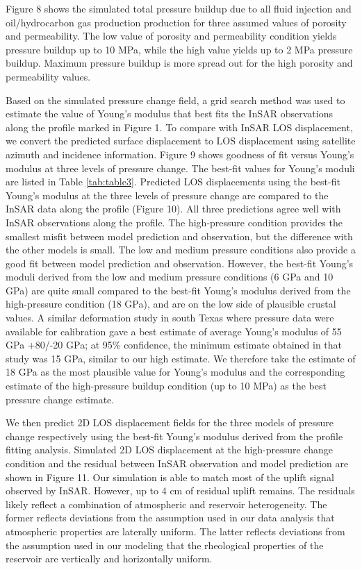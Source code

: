 Figure 8 shows the simulated total pressure buildup due to all fluid injection and oil/hydrocarbon gas production production for three assumed values of porosity and permeability. The low value of porosity and permeability condition yields pressure buildup up to 10 MPa, while the high value yields up to 2 MPa pressure buildup. Maximum pressure buildup is more spread out for the high porosity and permeability values.

Based on the simulated pressure change field, a grid search method was used to estimate the value of Young’s modulus that best fits the InSAR observations along the profile marked in Figure 1.   To compare with InSAR LOS displacement, we convert the predicted surface displacement to LOS displacement using satellite azimuth and incidence information.  Figure 9 shows goodness of fit versus Young’s modulus at three levels of pressure change.  The best-fit values for Young’s moduli are listed in Table \ref{tab:table3}.  Predicted LOS displacements using the best-fit Young’s modulus at the three levels of pressure change are compared to the InSAR data along the profile (Figure 10).  All three predictions agree well with InSAR observations along the profile.  The high-pressure condition provides the smallest misfit between model prediction and observation, but the difference with the other models is small.  The low and medium pressure conditions also provide a good fit between model prediction and observation.  However, the best-fit Young’s moduli derived from the low and medium pressure conditions (6 GPa  and 10 GPa) are quite small compared to the best-fit Young’s modulus derived from the high-pressure condition (18 GPa), and are on the low side of plausible crustal values.   A similar deformation study in south Texas \cite{karegar2015gps} where pressure data were available for calibration gave a best estimate of average Young’s modulus of 55 GPa +80/-20 GPa; at 95\% confidence, the minimum estimate obtained in that study was 15 GPa, similar to our high estimate.  We therefore take the estimate of 18 GPa as the most plausible value for Young’s modulus and the corresponding estimate of the high-pressure buildup condition (up to 10 MPa) as the best pressure change estimate.

We then predict 2D LOS displacement fields for the three models of pressure change respectively using the best-fit Young’s modulus derived from the profile fitting analysis.  Simulated 2D LOS displacement at the high-pressure change condition and the residual between InSAR observation and model prediction are shown in Figure 11.  Our simulation is able to match most of the uplift signal observed by InSAR.  However, up to 4 cm of residual uplift remains.  The residuals likely reflect a combination of atmospheric and reservoir heterogeneity.  The former reflects deviations from the assumption used in our data analysis that atmospheric properties are laterally uniform.  The latter reflects deviations from the assumption used in our modeling that the rheological properties of the reservoir are vertically and horizontally uniform. 

